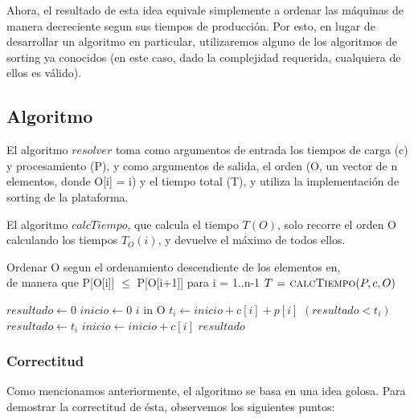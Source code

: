Ahora, el resultado de esta idea equivale simplemente a ordenar las m\'aquinas de manera decreciente segun sus tiempos de producci\'on. Por esto, en lugar de desarrollar un algoritmo en particular, utilizaremos alguno de los algoritmos de sorting ya conocidos (en este caso, dado la complejidad requerida, cualquiera de ellos es v\'alido).

\subsection{Algoritmo}
 
El algoritmo $resolver$ toma como argumentos de entrada los tiempos de carga (c) y procesamiento (P), y como argumentos de salida,
el orden (O, un vector de n elementos, donde O[i] = i) y el tiempo total (T), y utiliza la implementaci\'on
de sorting de la plataforma. 

El algoritmo $calcTiempo$, que calcula el tiempo $T(O)$, solo recorre el orden O
calculando los tiempos $T_{O}(i)$, y devuelve el m\'aximo de todos ellos. 


\begin{algorithm}[H]
\caption{}
\begin{codebox}
\li Ordenar O segun el ordenamiento descendiente de los elementos en, \\
 			de manera que P[O[i]] $\leq$ P[O[i+1]] para i = 1..n-1
\li $T  \mathrel{\hspace{1pt}=\hspace{1pt}} \textnormal{\scshape calcTiempo}(P, c, O)$
\End
\end{codebox}
\end{algorithm}

\begin{algorithm}[H]
\caption{} 
\begin{codebox}
\li $resultado \gets 0$
\li $inicio \gets 0$
\li \For $i$ in O\Do
\li   $t_i \gets inicio + c[i] + p[i]$ 	
\li  	\If $(resultado < t_i)$ \Do
\li 		$resultado \gets t_i$		
 		\End
\li		$inicio \gets inicio  + c[i]$ 		
 	\End	
\li \Return $resultado $
\End
\end{codebox}
\end{algorithm}

\subsubsection{Correctitud} 

Como mencionamos anteriormente, el algoritmo se basa en una idea golosa. Para demostrar la correctitud de \'esta, observemos los siguientes puntos:
 
